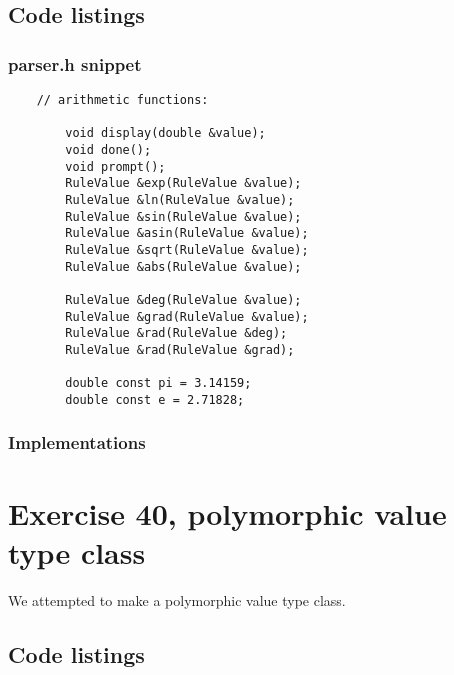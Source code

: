 \documentclass[11pt]{article}
\begin{document}
\subsection*{Code listings}

\subsubsection*{parser.h snippet}
\begin{lstlisting}
	// arithmetic functions:
	
		void display(double &value);
		void done();
		void prompt();
		RuleValue &exp(RuleValue &value);
		RuleValue &ln(RuleValue &value);
		RuleValue &sin(RuleValue &value);
		RuleValue &asin(RuleValue &value);
		RuleValue &sqrt(RuleValue &value);
		RuleValue &abs(RuleValue &value);
		
		RuleValue &deg(RuleValue &value);		
		RuleValue &grad(RuleValue &value);
		RuleValue &rad(RuleValue &deg);
		RuleValue &rad(RuleValue &grad);
		
		double const pi = 3.14159;
		double const e = 2.71828;
\end{lstlisting}

\subsubsection*{Implementations}












\section*{Exercise 40, polymorphic value type class}
We attempted to make a polymorphic value type class.

\subsection*{Code listings}
\end{document}

